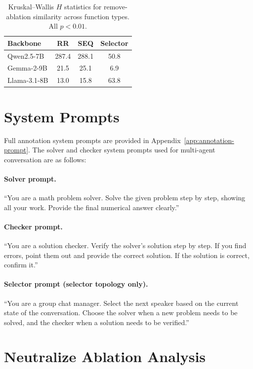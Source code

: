 \begin{table}[htbp]
\centering
\caption{Kruskal--Wallis $H$ statistics for remove-ablation similarity across function types. All $p < 0.01$.}
\label{tab:kruskal_wallis}
\small
\begin{tabular}{lccc}
\toprule
\textbf{Backbone} & \textbf{RR} & \textbf{SEQ} & \textbf{Selector} \\
\midrule
Qwen2.5-7B  & 287.4 & 288.1 & 50.8 \\
Gemma-2-9B  & 21.5 & 25.1 & 6.9 \\
Llama-3.1-8B & 13.0 & 15.8 & 63.8 \\
\bottomrule
\end{tabular}
\end{table}

\section{System Prompts}
\label{app:system-prompts}

Full annotation system prompts are provided in Appendix~\ref{app:annotation-prompt}. The solver and checker system prompts used for multi-agent conversation are as follows:

\paragraph{Solver prompt.} ``You are a math problem solver. Solve the given problem step by step, showing all your work. Provide the final numerical answer clearly.''

\paragraph{Checker prompt.} ``You are a solution checker. Verify the solver's solution step by step. If you find errors, point them out and provide the correct solution. If the solution is correct, confirm it.''

\paragraph{Selector prompt (selector topology only).} ``You are a group chat manager. Select the next speaker based on the current state of the conversation. Choose the solver when a new problem needs to be solved, and the checker when a solution needs to be verified.''

\section{Neutralize Ablation Analysis}
\label{app:neutralize}

